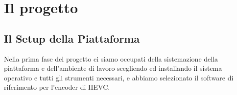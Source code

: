 
\chapter{Il progetto} %

\label{Chapter6} %


\section{Il Setup della Piattaforma}
Nella prima fase del progetto ci siamo occupati della sistemazione della 
piattaforma e dell'ambiente di lavoro scegliendo ed installando il sistema 
operativo e tutti gli strumenti necessari, e abbiamo selezionato il software di 
riferimento per l'encoder di HEVC.
